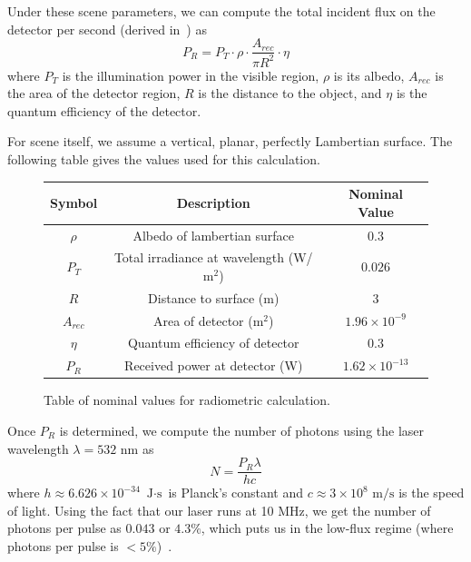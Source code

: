 \documentclass[runningheads]{llncs}
\begin{document}
Under these scene parameters, we can compute the total incident
flux on the detector per second (derived in~\cite{mcmanamon2012ladar}) as
\begin{equation}
  P_R = P_T \cdot \rho \cdot \frac{A_{rec}}{\pi R^2} \cdot \eta
\end{equation}
where $P_T$ is the illumination power in the visible region, $\rho$ is its
albedo, $A_{rec}$ is the area of the detector region, $R$ is the distance to the
object, and $\eta$ is the quantum efficiency of the detector.

For scene itself, we assume a vertical, planar, perfectly Lambertian surface. The following table gives the values used for this calculation.
\begin{figure}[H]
  \centering
  \begin{tabular}{c|c|c}
    \toprule
    Symbol & Description & Nominal Value \\
    \midrule
    $\rho$  & Albedo of lambertian surface & $0.3$ \\
    $P_T$ & Total irradiance at wavelength (W/$\text{m}^2$) & $0.026$ \\
    $R$ & Distance to surface (m) & $3$ \\
    $A_{rec}$ & Area of detector ($\text{m}^2$) & $1.96 \times 10^{-9}$ \\
    $\eta$ & Quantum efficiency of detector & $0.3$ \\
    $P_R$ & Received power at detector (W) & $1.62 \times 10^{-13}$ \\
    \bottomrule
  \end{tabular}
  \caption{Table of nominal values for radiometric calculation.}
  \label{fig:sbr_calculation}
\end{figure}
Once $P_R$ is determined, we compute the number of photons using the laser
wavelength $\lambda = 532$ nm as
\begin{equation}
  N = \frac{P_R\lambda}{hc}
\end{equation}
where $h \approx 6.626 \times 10^{-34}$ $\text{J} \cdot \text{s}$ is Planck's constant and $c \approx 3
\times 10^8$ $\text{m}/\text{s}$ is the speed of light. Using the fact that our laser runs at 10
MHz, we get the number of photons per pulse as $0.043$ or $4.3\%$, which puts us in the
low-flux regime (where photons per pulse is $< 5\%$)~\cite{oconnortcspc}.
\end{document}
